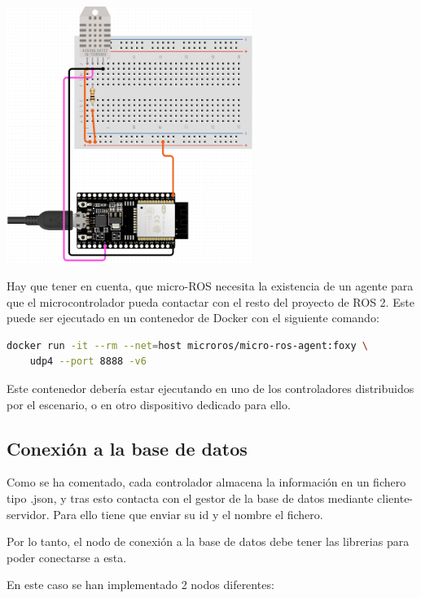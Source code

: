 \begin{center}
    \centering
    \includegraphics[width=0.6\textwidth]{img/06-DiagramaESP32.png}
    \label{fig:esp32-dht11}
\end{center}

Hay que tener en cuenta, que micro-ROS necesita la existencia de un agente para que el microcontrolador pueda contactar con el resto del proyecto de ROS 2. Este puede ser ejecutado en un contenedor de Docker \cite{docker} con el siguiente comando:

\begin{lstlisting}[language=Bash, caption=Ejecución Agente de micro-ROS en un contenedor Docker]
docker run -it --rm --net=host microros/micro-ros-agent:foxy \ 
    udp4 --port 8888 -v6
\end{lstlisting}

Este contenedor debería estar ejecutando en uno de los controladores distribuidos por el escenario, o en otro dispositivo dedicado para ello.

\subsection{Conexión a la base de datos}

Como se ha comentado, cada controlador almacena la información en un fichero tipo .json, y tras esto contacta con el gestor de la base de datos mediante cliente-servidor. Para ello tiene que enviar su id y el nombre el fichero.

Por lo tanto, el nodo de conexión a la base de datos debe tener las librerias para poder conectarse a esta.

En este caso se han implementado 2 nodos diferentes:

